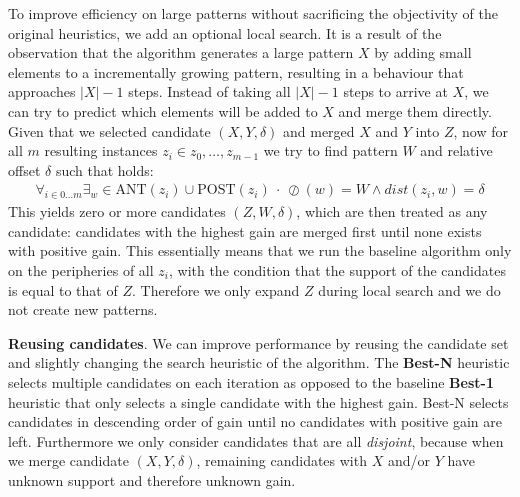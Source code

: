 \documentclass{llncs}
\begin{document}
To improve efficiency on large patterns without sacrificing the objectivity of the original heuristics, we add an optional local search. It is a result of the observation that the algorithm generates a large pattern $X$ by adding small elements to a incrementally growing pattern, resulting in a behaviour that approaches $|X|-1$ steps. Instead of taking all $|X|-1$ steps to arrive at $X$, we can try to predict which elements will be added to $X$ and merge them directly. Given that we selected candidate $(X,Y,\delta)$ and merged $X$ and $Y$ into $Z$, now for all $m$ resulting instances $z_i \in {z_0,\dots,z_{m-1}}$ we try to find pattern $W$ and relative offset $\delta$ such that holds:
\begin{align}
\label{floodfill}
\forall_{i\in 0\dots m} \exists_w \in \mathrm{ANT}(z_i) \cup \mathrm{POST}(z_i) \ \cdot \ \oslash(w) = W \land dist(z_i, w) = \delta 
\end{align}
\noindent This yields zero or more candidates $(Z,W,\delta)$, which are then treated as any candidate: candidates with the highest gain are merged first until none exists with positive gain. This essentially means that we run the baseline algorithm only on the peripheries of all $z_i$, with the condition that the support of the candidates is equal to that of $Z$. Therefore we only expand $Z$ during local search and we do not create new patterns. 



\smallskip \noindent \textbf{Reusing candidates}.  We can improve performance by reusing the candidate set and slightly changing the search heuristic of the algorithm. The \textbf{Best-N} heuristic selects multiple candidates on each iteration as opposed to the baseline \textbf{Best-1} heuristic that only selects a single candidate with the highest gain. Best-N selects candidates in descending order of gain until no candidates with positive gain are left. Furthermore we only consider candidates that are all \emph{disjoint}, because when we merge candidate $(X,Y,\delta)$, remaining candidates with $X$ and/or $Y$ have unknown support and therefore unknown gain.%
\end{document}
